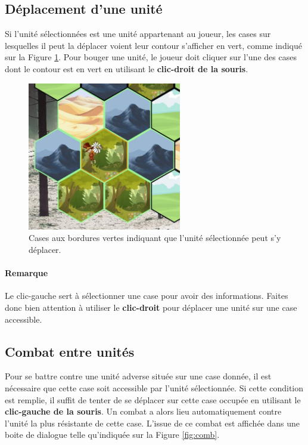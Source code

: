 		\newpage
		\subsection{Déplacement d'une unité}
		Si l'unité sélectionnées est une unité appartenant au joueur, les cases sur lesquelles il peut la déplacer voient leur contour s'afficher en vert, comme indiqué sur la {\sc Figure }{\ref {fig:case}}. Pour bouger une unité, le joueur doit cliquer sur l'une des cases dont le contour est en vert en utilisant le {\bf clic-droit de la souris}.
		
		\begin{figure}[h!]
			\begin{center}
				\includegraphics[width=0.6\textwidth]{figure/caseaccessible.jpg}
			\end{center}
			\caption{Cases aux bordures vertes indiquant que l'unité sélectionnée peut s'y déplacer.}
			\label{fig:case}
		\end{figure}
		
		\paragraph{Remarque} Le clic-gauche sert à sélectionner une case pour avoir des informations. Faites donc bien attention à utiliser le {\bf clic-droit} pour déplacer une unité sur une case accessible.
		
		
		\subsection{Combat entre unités}
		Pour se battre contre une unité adverse située sur une case donnée, il est nécessaire que cette case soit accessible par l'unité sélectionnée. Si cette condition est remplie, il suffit de tenter de se déplacer sur cette case occupée en utilisant le {\bf clic-gauche de la souris}. Un combat a alors lieu automatiquement contre l'unité la plus résistante de cette case. L'issue de ce combat est affichée dans une boite de dialogue telle qu'indiquée sur la {\sc Figure }{\ref {fig:comb}}.
		
